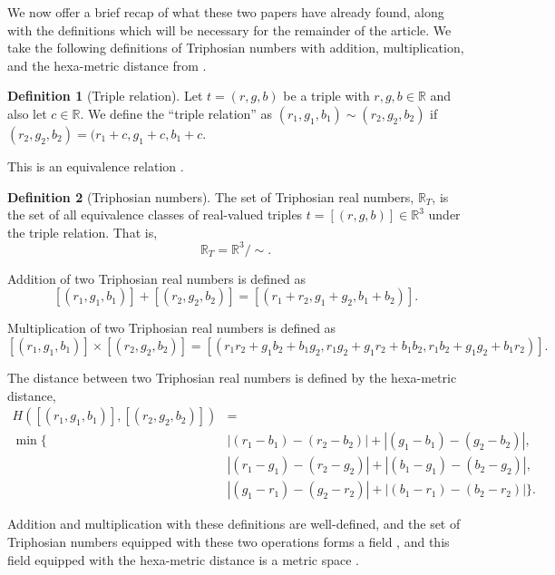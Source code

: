 \documentclass{article}
\theoremstyle{plain}
\theoremstyle{definition}
\newtheorem*{definition}{Definition}
\begin{document}
	We now offer a brief recap of what these two papers have already found,
	along with the definitions which will be necessary for the remainder of the
	article. We take the following definitions of Triphosian numbers with
	addition, multiplication, and the hexa-metric distance from
	\cite{grossnickle}.

	\begin{definition}[Triple relation]
		Let \(t = (r, g, b)\) be a triple with $r, g, b \in \mathbb{R}$ and
		also let \(c \in \mathbb{R}\). We define the ``triple relation'' as
		\((r_1, g_1, b_1) \sim (r_2, g_2, b_2)\) if \((r_2, g_2, b_2) = (r_1 +
		c, g_1 + c, b_1 + c\).
	\end{definition}

	This is an equivalence relation \cite{egging}.

	\begin{definition}[Triphosian numbers]
		The set of Triphosian real numbers, \(\mathbb{R}_T\), is the set of all
		equivalence classes of real-valued triples \(t = [(r, g, b)] \in
		\mathbb{R}^3\) under the triple relation. That is,
		\[\mathbb{R}_T = \mathbb{R}^3 / \sim.\]

		Addition of two Triphosian real numbers is defined as
		\[[(r_1, g_1, b_1)] + [(r_2, g_2, b_2)] = [(r_1 + r_2, g_1 + g_2, b_1 +
		b_2)].\]

		Multiplication of two Triphosian real numbers is defined as
		\[[(r_1, g_1, b_1)] \times [(r_2, g_2, b_2)] = [(r_1r_2 + g_1b_2 +
		b_1g_2, r_1g_2 + g_1r_2 + b_1b_2, r_1b_2 + g_1g_2 + b_1r_2)].\]

		The distance between two Triphosian real numbers is defined by the
		hexa-metric distance,
		\begin{align*}
			H([(r_1, g_1, b_1)], [(r_2, g_2, b_2)]) &=  \\
			\min\{ & |(r_1 - b_1) - (r_2 - b_2)| + |(g_1 - b_1) - (g_2 -
			b_2)|, \\
			& |(r_1 - g_1) - (r_2 - g_2)| + |(b_1 - g_1) - (b_2 - g_2)|, \\
			& |(g_1 - r_1) - (g_2 - r_2)| + |(b_1 - r_1) - (b_2 - r_2)| \}.
		\end{align*}
	\end{definition}

	Addition and multiplication with these definitions are well-defined,
	and the set of Triphosian numbers equipped with these two operations
	forms a field , and this field equipped with the hexa-metric distance is a
	metric space \cite{egging}.
\end{document}
